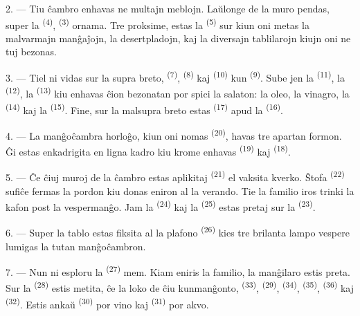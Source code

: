 2. --- Tiu ĉambro enhavas ne multajn meblojn. Laŭlonge de la muro pendas,
super la  \textsuperscript{(4)}, 
\textsuperscript{(3)} ornama. Tre proksime, estas la 
\textsuperscript{(5)} sur kiun oni metas la malvarmajn manĝaĵojn, la
desertpladojn, kaj la diversajn tablilarojn kiujn oni ne tuj bezonas.

3. --- Tiel ni vidas sur la supra breto, 
\textsuperscript{(7)},  \textsuperscript{(8)} kaj 
\textsuperscript{(10)} kun  \textsuperscript{(9)}. Sube jen la
 \textsuperscript{(11)}, la 
\textsuperscript{(12)}, la  \textsuperscript{(13)} kiu
enhavas ĉion bezonatan por spici la salaton: la oleo, la vinagro, la
 \textsuperscript{(14)} kaj la 
\textsuperscript{(15)}. Fine, sur la malsupra breto estas 
\textsuperscript{(17)} apud la  \textsuperscript{(16)}.

4. --- La manĝoĉambra horloĝo, kiun oni nomas 
\textsuperscript{(20)}, havas tre apartan formon. Ĝi estas enkadrigita en ligna
kadro kiu krome enhavas  \textsuperscript{(19)} kaj
 \textsuperscript{(18)}.

\VUsaut{4.6mm}
\VUsaut{3.0mm}

5. --- Ĉe ĉiuj muroj de la ĉambro estas aplikitaj 
\textsuperscript{(21)} el vaksita kverko. Ŝtofa 
\textsuperscript{(22)} sufiĉe fermas la pordon kiu donas eniron al la verando.
Tie la familio iros trinki la kafon post la vespermanĝo. Jam la 
\textsuperscript{(24)} kaj la  \textsuperscript{(25)} estas
pretaj sur la  \textsuperscript{(23)}.

6. --- Super la tablo estas fiksita al la plafono 
\textsuperscript{(26)} kies tre brilanta lampo vespere lumigas la tutan
manĝoĉambron.

7. --- Nun ni esploru la  \textsuperscript{(27)} mem. Kiam
eniris la familio, la manĝilaro estis preta. Sur la 
\textsuperscript{(28)} estis metita, ĉe la loko de ĉiu kunmanĝonto,
 \textsuperscript{(33)}, 
\textsuperscript{(29)},  \textsuperscript{(34)},
 \textsuperscript{(35)}, 
\textsuperscript{(36)} kaj  \textsuperscript{(32)}. Estis ankaŭ
 \textsuperscript{(30)} por vino kaj 
\textsuperscript{(31)} por akvo.

